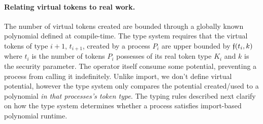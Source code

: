 \paragraph{Relating virtual tokens to real work.}
The number of virtual tokens created are bounded through a globally known polynomial \GlobalF defined at compile-time.
The type system requires that the virtual tokens of type $i+1$, $t_{i+1}$, created by a process $P_i$ are upper bounded by $\mathfrak{f}(t_i, k)$ where $t_i$ is the number of tokens $P_i$ possesses of its real token type $K_i$ and $k$ is the security parameter.
The \inline{$\nwithdraw$} operator itself consume some potential, preventing a process from calling it indefinitely.
Unlike import, we don't define virtual potential, however the type system only compares the potential created/used to a polynomial \emph{in that processes's token type}.
The typing rules described next clarify on how the type system determines whether a process satisfies import-based polynomial runtime.





